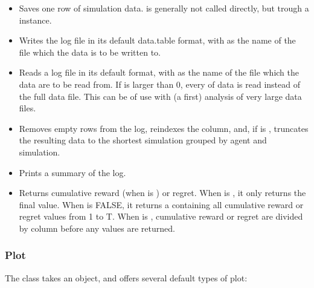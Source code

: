 \documentclass{jss}\usepackage[]{graphicx}\usepackage[]{color}
\begin{document}
\begin{itemize}
 \item{}{
    Saves one row of simulation data.  is generally not called directly, but trough a  instance.
 }
 \item{}{
    Writes the  log file in its default data.table format,
    with  as the name of the file which the data is to be written to.
 }
 \item{}{
    Reads a  log file in its default  format,
    with  as the name of the file which the data are to be read from.
    If  is larger than 0, every  of data is read instead of the
    full data file. This can be of use with (a first) analysis of very large data files.
 }
 \item{}{
    Removes empty rows from the  log, reindexes the  column, and,
    if  is , truncates the resulting data to the shortest simulation
    grouped by agent and simulation.
 }
 \item{}{
    Prints a summary of the  log.
 }
 \item{}{
    Returns cumulative reward (when  is ) or regret. When  is ,
    it only returns the final value. When  is FALSE, it returns a  containing all
    cumulative reward or regret values from 1 to T.
    When  is , cumulative reward or regret are divided by column  before any values
    are returned.
 }
\end{itemize}

\subsubsection{Plot}

The  class takes an  object, and offers several default types of plot:
\end{document}
